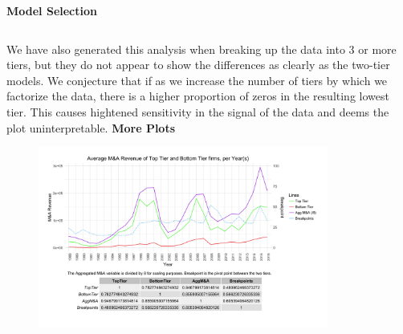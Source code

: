 \documentclass{article}
\begin{document}
{\large \textbf{Model Selection} }
\begin{figure}[H]
\centering
\begin{tabular}{cccc}
\end{tabular}
\end{figure}
We have also generated this analysis when breaking up the data into 3 or more tiers, but they do not appear to show the differences as clearly as the two-tier models. We conjecture that if as we increase the number of tiers by which we factorize the data, there is a higher proportion of zeros in the resulting lowest tier. This causes hightened sensitivity in the signal of the data and deems the plot uninterpretable.
\newpage
{\large \textbf{More Plots} }
\begin{figure}[H]\centering
\includegraphics[width=0.85\textwidth]{../IndivTexOutput/MnADifferences.jpg}\end{figure}

\newpage
\end{document}
